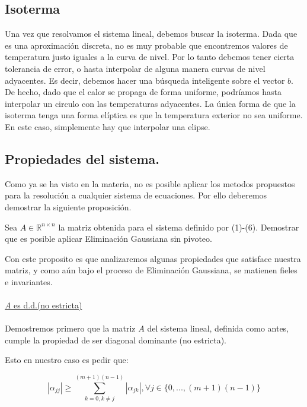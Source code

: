 \subsection{Isoterma}
Una vez que resolvamos el sistema lineal, debemos buscar la isoterma. Dada que es una aproximación discreta, no es muy probable que encontremos valores de temperatura justo iguales a la curva de nivel. Por lo tanto debemos tener cierta tolerancia de error, o hasta interpolar de alguna manera curvas de nivel adyacentes. Es decir, debemos hacer una búsqueda inteligente sobre el vector $b$. De hecho, dado que el calor se propaga de forma uniforme, podríamos hasta interpolar un circulo con las temperaturas adyacentes. La única forma de que la isoterma tenga una forma elíptica es que la temperatura exterior no sea uniforme. En este caso, simplemente hay que interpolar una elipse.
\\
\subsection{Propiedades del sistema.}
Como ya se ha visto en la materia, no es posible aplicar los metodos propuestos para la resoluci\'on a cualquier sistema de ecuaciones. Por ello deberemos demostrar la siguiente proposici\'on.

\begin{proposition}
Sea $A \in \mathbb{R}^{n \times n}$ la matriz obtenida para el sistema definido por (1)-(6). Demostrar que es posible
aplicar Eliminaci\'on Gaussiana sin pivoteo.
\end{proposition}

Con este proposito es que analizaremos algunas propiedades que satisface nuestra matriz, y como a\'un bajo el proceso de Eliminaci\'on Gaussiana, se matienen fieles e invariantes.
\\
\\
\underline{\textit{A} es d.d.(no estricta)}
\\
\\
Demostremos primero que la matriz $A$ del sistema lineal, definida como antes, cumple la propiedad de ser diagonal dominante (no estricta).

Esto en nuestro caso es pedir que:

\begin{equation}
 \left | \alpha_{jj} \right | \geq \sum_{k=0,k \neq j}^{(m+1)(n-1)} \left | \alpha_{jk} \right |, \forall j \in \{ 0,...,(m+1)(n-1)\}
\end{equation}

